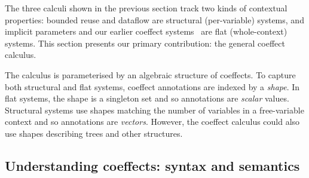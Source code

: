 The three calculi shown in the previous section track two kinds of
contextual properties: bounded reuse and dataflow are structural
(per-variable) systems, and implicit parameters and our earlier coeffect
systems~\cite{petricek2013coeffects} are flat (whole-context) systems. 
This section presents our primary contribution: the general coeffect
calculus.  

The calculus is parameterised by an algebraic structure of coeffects.
To capture both structural and flat systems, coeffect annotations are
indexed by a \emph{shape}. In flat systems, the shape is a singleton set
and so annotations are \emph{scalar} values. Structural systems use shapes
matching the number of variables in a free-variable context and so annotations
are \emph{vectors}. However, the coeffect calculus could also use shapes describing
trees and other structures.


\subsection{Understanding coeffects: syntax and semantics}

